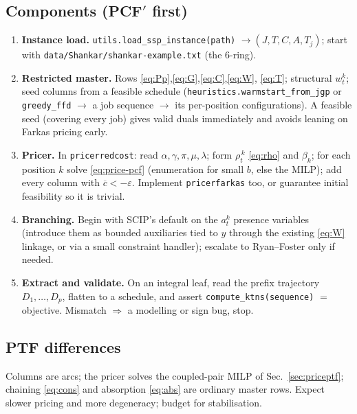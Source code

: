 \documentclass[11pt,a4paper]{article}
\theoremstyle{plain}
\theoremstyle{definition}
\newcommand{\RC}{\overline{c}}
\begin{document}
\subsection{Components (PCF$'$ first)}
\begin{enumerate}
\item \textbf{Instance load.} \texttt{utils.load\_ssp\_instance(path)} $\to(J,T,C,A,T_j)$;
      start with \texttt{data/Shankar/shankar-example.txt} (the $6$-ring).
\item \textbf{Restricted master.} Rows \eqref{eq:Pp},\eqref{eq:G},\eqref{eq:C},\eqref{eq:W},
      \eqref{eq:T}; structural $w_t^k$; seed columns from a feasible schedule
      (\texttt{heuristics.warmstart\_from\_jgp} or \texttt{greedy\_ffd} $\to$ a job sequence
      $\to$ its per-position configurations). A feasible seed (covering every job) gives valid
      duals immediately and avoids leaning on Farkas pricing early.
\item \textbf{Pricer.} In \texttt{pricerredcost}: read $\alpha,\gamma,\pi,\mu,\lambda$; form
      $\rho_t^{\,k}$ \eqref{eq:rho} and $\beta_k$; for each position $k$ solve
      \eqref{eq:price-pcf} (enumeration for small $b$, else the MILP); add every column with
      $\RC<-\varepsilon$. Implement \texttt{pricerfarkas} too, or guarantee initial feasibility so
      it is trivial.
\item \textbf{Branching.} Begin with SCIP's default on the $a_t^k$ presence variables (introduce
      them as bounded auxiliaries tied to $y$ through the existing \eqref{eq:W} linkage, or via a
      small constraint handler); escalate to Ryan--Foster only if needed.
\item \textbf{Extract and validate.} On an integral leaf, read the prefix trajectory
      $D_1,\dots,D_p$, flatten to a schedule, and assert
      \texttt{compute\_ktns(sequence)} $=$ objective. Mismatch $\Rightarrow$ a modelling or
      sign bug, stop.
\end{enumerate}

\subsection{PTF differences}
Columns are arcs; the pricer solves the coupled-pair MILP of Sec.~\ref{sec:priceptf}; chaining
\eqref{eq:cons} and absorption \eqref{eq:abs} are ordinary master rows. Expect slower pricing and
more degeneracy; budget for stabilisation.
\end{document}
